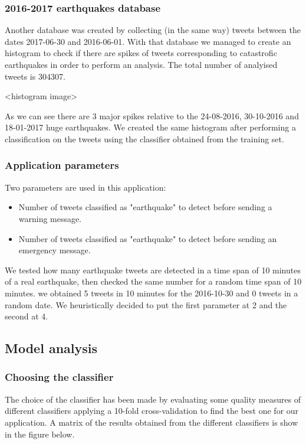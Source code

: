 \documentclass[a4paper, oneside]{article}
\begin{document}
\subsubsection{2016-2017 earthquakes database}
Another database was created by collecting (in the same way) tweets between the dates 2017-06-30 and 2016-06-01. With that database we managed to create an histogram to check if there are spikes of tweets corresponding to catastrofic earthquakes in order to perform an analysis. The total number of analyised tweets is 304307.

<histogram image>

As we can see there are 3 major spikes relative to the 24-08-2016, 30-10-2016 and 18-01-2017 huge earthquakes. We created the same histogram after performing a classification on the tweets using the classifier obtained from the training set.

\subsubsection{Application parameters}
Two parameters are used in this application:
\begin{itemize}
\item Number of tweets classified as "earthquake" to detect before sending a warning message.
\item Number of tweets classified as "earthquake" to detect before sending an emergency message.
\end{itemize}
We tested how many earthquake tweets are detected in a time span of 10 minutes of a real earthquake, then checked the same number for a random time span of 10 minutes. we obtained  5 tweets in 10 minutes for the 2016-10-30 and 0 tweets in a random date. We heuristically decided to put the first parameter at 2 and the second at 4.

\clearpage
\subsection{Model analysis}
\subsubsection{Choosing the classifier}
The choice of the classifier has been made by evaluating some quality measures of different classifiers applying a 10-fold cross-validation to find the best one for our application. A matrix of the results obtained from the different classifiers is show in the figure below.
\end{document}
